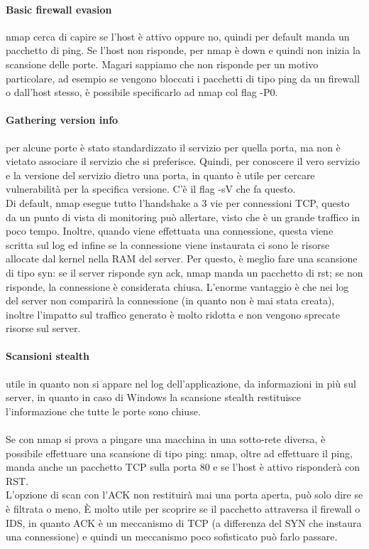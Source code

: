 \documentclass{article}
\begin{document}
\paragraph{Basic firewall evasion}nmap cerca di capire se l'host è attivo oppure no, quindi per default manda un pacchetto di ping. Se l'host non risponde, per nmap è down e quindi non inizia la scansione delle porte. Magari sappiamo che non risponde per un motivo particolare, ad esempio se vengono bloccati i pacchetti di tipo ping da un firewall o dall'host stesso, è possibile specificarlo ad nmap col flag -P0.
\paragraph{Gathering version info}per alcune porte è stato standardizzato il servizio per quella porta, ma non è vietato associare il servizio che si preferisce. Quindi, per conoscere il vero servizio e la versione del servizio dietro una porta, in quanto è utile per cercare vulnerabilità per la specifica versione. C'è il flag -sV che fa questo.\\ Di default, nmap esegue tutto l'handshake a 3 vie per connessioni TCP, questo da un punto di vista di monitoring può allertare, visto che è un grande traffico in poco tempo. Inoltre, quando viene effettuata una connessione, questa viene scritta sul log ed infine se la connessione viene instaurata ci sono le risorse allocate dal kernel nella RAM del server. Per questo, è meglio fare una scansione di tipo syn: se il server risponde syn ack, nmap manda un pacchetto di rst; se non risponde, la connessione è considerata chiusa. L'enorme vantaggio è che nei log del server non comparirà la connessione (in quanto non è mai stata creata), inoltre l'impatto sul traffico generato è molto ridotta e non vengono sprecate risorse sul server.
\paragraph{Scansioni stealth}utile in quanto non si appare nel log dell'applicazione, da informazioni in più sul server, in quanto in caso di Windows la scansione stealth restituisce l'informazione che tutte le porte sono chiuse.
\\\\ Se con nmap si prova a pingare una macchina in una sotto-rete diversa, è possibile effettuare una scansione di tipo ping: nmap, oltre ad effettuare il ping, manda anche un pacchetto TCP sulla porta 80 e se l'host è attivo risponderà con RST.\\ L'opzione di scan con l'ACK non restituirà mai una porta aperta, può solo dire se è filtrata o meno, È molto utile per scoprire se il pacchetto attraversa il firewall o IDS, in quanto ACK è un meccanismo di TCP (a differenza del SYN che instaura una connessione) e quindi un meccanismo poco sofisticato può farlo passare.
\end{document}
